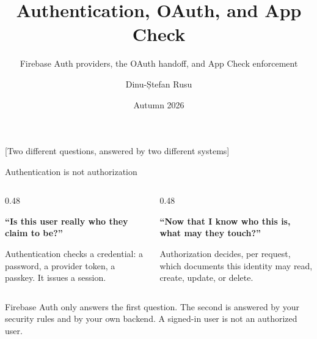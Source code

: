 \documentclass[10pt,aspectratio=169,t]{beamer}
\title{Authentication, OAuth, and App Check}
\subtitle{Firebase Auth providers, the OAuth handoff, and App Check enforcement}
\author{Dinu-Ștefan Rusu}
\institute{FILS, Universitatea Politehnica București}
\date{Autumn 2026}
\begin{document}
\titleframe


[Two different questions, answered by two different systems]

\begin{frame}[eyebrow=Fundamentals]{Authentication is not authorization}
  \vskip 2mm
  \begin{columns}[T]
    \begin{column}{0.48\textwidth}
      \begin{panel}
        {\color{upbBlue}\bfseries``Is this user really who they claim to be?''}\par\vskip 1.5mm
        Authentication checks a credential: a password, a provider token, a passkey. It issues a session.
      \end{panel}
    \end{column}
    \begin{column}{0.48\textwidth}
      \begin{panel}
        {\color{upbBlue}\bfseries``Now that I know who this is, what may they touch?''}\par\vskip 1.5mm
        Authorization decides, per request, which documents this identity may read, create, update, or delete.
      \end{panel}
    \end{column}
  \end{columns}
  \begin{takeaway}{Firebase Auth only answers the first question.}
    The second is answered by your security rules and by your own backend. A signed-in user is not an authorized user.
  \end{takeaway}
\end{frame}
\end{document}

